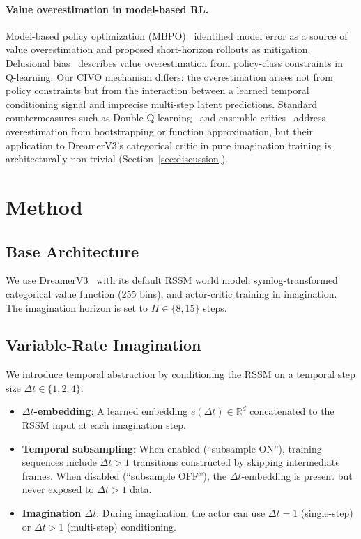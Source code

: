 \documentclass[10pt,letterpaper]{article}
\newcommand{\dt}{\Delta t}
\begin{document}
\paragraph{Value overestimation in model-based RL.}
Model-based policy optimization (MBPO)~\citep{janner2019trust} identified model error as a source of value overestimation and proposed short-horizon rollouts as mitigation. Delusional bias~\citep{lu2018non} describes value overestimation from policy-class constraints in Q-learning. Our CIVO mechanism differs: the overestimation arises not from policy constraints but from the interaction between a learned temporal conditioning signal and imprecise multi-step latent predictions. Standard countermeasures such as Double Q-learning~\citep{hasselt2016deep} and ensemble critics~\citep{chen2021randomized} address overestimation from bootstrapping or function approximation, but their application to DreamerV3's categorical critic in pure imagination training is architecturally non-trivial (Section~\ref{sec:discussion}).

\section{Method}
\label{sec:method}

\subsection{Base Architecture}

We use DreamerV3~\citep{hafner2023mastering} with its default RSSM world model, symlog-transformed categorical value function (255 bins), and actor-critic training in imagination. The imagination horizon is set to $H \in \{8, 15\}$ steps.

\subsection{Variable-Rate Imagination}

We introduce temporal abstraction by conditioning the RSSM on a temporal step size $\dt \in \{1, 2, 4\}$:

\begin{itemize}[itemsep=2pt]
    \item \textbf{$\dt$-embedding}: A learned embedding $e(\dt) \in \mathbb{R}^d$ concatenated to the RSSM input at each imagination step.
    \item \textbf{Temporal subsampling}: When enabled (``subsample ON''), training sequences include $\dt > 1$ transitions constructed by skipping intermediate frames. When disabled (``subsample OFF''), the $\dt$-embedding is present but never exposed to $\dt > 1$ data.
    \item \textbf{Imagination $\dt$}: During imagination, the actor can use $\dt = 1$ (single-step) or $\dt > 1$ (multi-step) conditioning.
\end{itemize}
\end{document}
